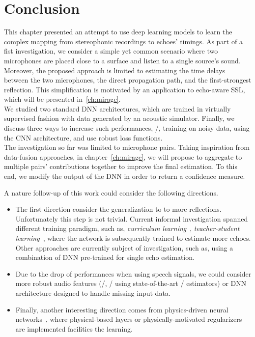 \section{Conclusion}\label{sec:lantern:conclusion}
This chapter presented an attempt to use deep learning models to learn the complex mapping from stereophonic recordings to echoes' timings.
As part of a fist investigation, we consider a simple yet common scenario where two microphones are placed close to a surface and listen to a single source's sound.
Moreover, the proposed approach is limited to estimating the time delays between the two microphones, the direct propagation path, and the first-strongest reflection.
This simplification is motivated by an application to echo-aware \ac{SSL}, which will be presented in~\cref{ch:mirage}.
\\We studied two standard \ac{DNN} architectures, which are trained in virtually supervised fashion with data generated by an acoustic simulator.
Finally, we discuss three ways to increase such performances, \ie/, training on noisy data, using the \ac{CNN} architecture, and use robust loss functions.
\\The investigation so far was limited to microphone pairs.
Taking inspiration from data-fusion approaches, in chapter~\cref{ch:mirage}, we will propose to aggregate to multiple pairs' contributions together to improve the final estimation.
To this end, we modify the output of the \ac{DNN} in order to return a confidence measure.

\mynewline
A nature follow-up of this work could consider the following directions.
\begin{itemize}
    \item The first direction consider the generalization to to more reflections.
    Unfortunately this step is not trivial.
    Current informal investigation spanned different training paradigm, such as, \textit{curriculum learning}~, \textit{teacher-student learning}~, where the network is subsequently trained to estimate more echoes.
    Other approaches are currently subject of investigation, such as, using a combination of \acs{DNN} pre-trained for single echo estimation.
    \item Due to the drop of performances when using speech signals, we could consider more robust audio features (\eg/, \ReTF/ using state-of-the-art \ReTF/ estimators) or
    \ac{DNN} architecture designed to handle missing input data.
    \item Finally, another interesting direction comes from physics-driven neural networks~,
    where physical-based layers or physically-motivated regularizers are implemented facilities the learning.
\end{itemize}

